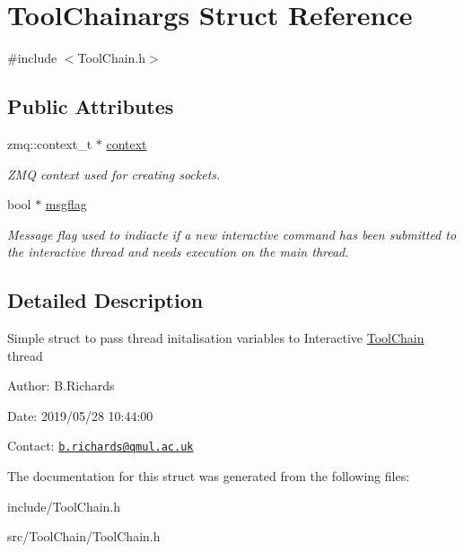\hypertarget{structToolChainargs}{\section{Tool\-Chainargs Struct Reference}
\label{structToolChainargs}
}


{\ttfamily \#include $<$Tool\-Chain.\-h$>$}

\subsection*{Public Attributes}
\begin{DoxyCompactItemize}
\item 
\hypertarget{structToolChainargs_abc87ef74c936d9b171655899e9b4927b}{zmq\-::context\-\_\-t $\ast$ \hyperlink{structToolChainargs_abc87ef74c936d9b171655899e9b4927b}{context}}\label{structToolChainargs_abc87ef74c936d9b171655899e9b4927b}

\begin{DoxyCompactList}\small\item\em Z\-M\-Q context used for creating sockets. \end{DoxyCompactList}\item 
\hypertarget{structToolChainargs_a12b7600b4c7a0362703a1d75d6090ee5}{bool $\ast$ \hyperlink{structToolChainargs_a12b7600b4c7a0362703a1d75d6090ee5}{msgflag}}\label{structToolChainargs_a12b7600b4c7a0362703a1d75d6090ee5}

\begin{DoxyCompactList}\small\item\em Message flag used to indiacte if a new interactive command has been submitted to the interactive thread and needs execution on the main thread. \end{DoxyCompactList}\end{DoxyCompactItemize}


\subsection{Detailed Description}
Simple struct to pass thread initalisation variables to Interactive \hyperlink{classToolChain}{Tool\-Chain} thread

\begin{DoxyParagraph}{Author\-:}
B.\-Richards 
\end{DoxyParagraph}
\begin{DoxyParagraph}{Date\-:}
2019/05/28 10\-:44\-:00 
\end{DoxyParagraph}
Contact\-: \href{mailto:b.richards@qmul.ac.uk}{\tt b.\-richards@qmul.\-ac.\-uk} 

The documentation for this struct was generated from the following files\-:\begin{DoxyCompactItemize}
\item 
include/Tool\-Chain.\-h\item 
src/\-Tool\-Chain/Tool\-Chain.\-h\end{DoxyCompactItemize}
